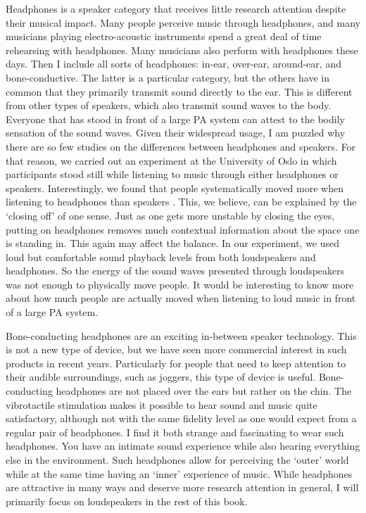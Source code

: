 Headphones is a speaker category that receives little research attention despite their musical impact. Many people perceive music through headphones, and many musicians playing electro-acoustic instruments spend a great deal of time rehearsing with headphones. Many musicians also perform with headphones these days. Then I include all sorts of headphones: in-ear, over-ear, around-ear, and bone-conductive. The latter is a particular category, but the others have in common that they primarily transmit sound directly to the ear. This is different from other types of speakers, which also transmit sound waves to the body. Everyone that has stood in front of a large PA system can attest to the bodily sensation of the sound waves. Given their widespread usage, I am puzzled why there are so few studies on the differences between headphones and speakers. For that reason, we carried out an experiment at the University of Oslo in which participants stood still while listening to music through either headphones or speakers. Interestingly, we found that people systematically moved more when listening to headphones than speakers \citep{zelechowska_headphones_2020}. This, we believe, can be explained by the `closing off' of one sense. Just as one gets more unstable by closing the eyes, putting on headphones removes much contextual information about the space one is standing in. This again may affect the balance. In our experiment, we used loud but comfortable sound playback levels from both loudspeakers and headphones. So the energy of the sound waves presented through loudspeakers was not enough to physically move people. It would be interesting to know more about how much people are actually moved when listening to loud music in front of a large PA system.

Bone-conducting headphones are an exciting in-between speaker technology. This is not a new type of device, but we have seen more commercial interest in such products in recent years. Particularly for people that need to keep attention to their audible surroundings, such as joggers, this type of device is useful. Bone-conducting headphones are not placed over the ears but rather on the chin. The vibrotactile stimulation makes it possible to hear sound and music quite satisfactory, although not with the same fidelity level as one would expect from a regular pair of headphones. I find it both strange and fascinating to wear such headphones. You have an intimate sound experience while also hearing everything else in the environment. Such headphones allow for perceiving the `outer' world while at the same time having an `inner' experience of music. While headphones are attractive in many ways and deserve more research attention in general, I will primarily focus on loudspeakers in the rest of this book.

